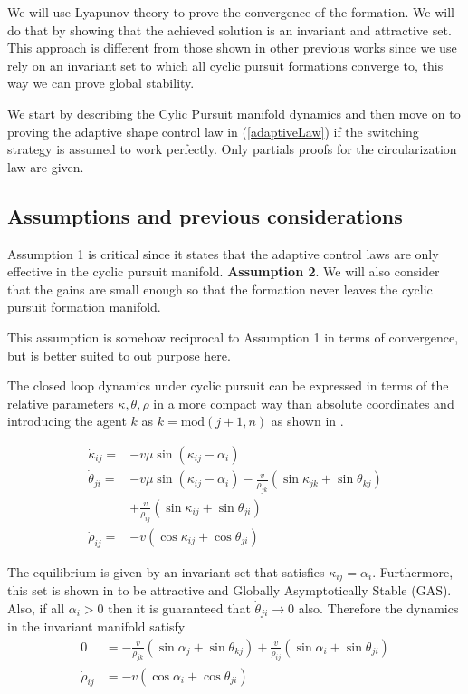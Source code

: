 We will use Lyapunov theory to prove the convergence of the formation. We will do that by showing that the achieved solution is an invariant and attractive set. This approach is different from those shown in other previous works since we use rely on an invariant set to which all cyclic pursuit formations converge to, this way we can prove global stability.

We start by describing the Cylic Pursuit manifold dynamics and then move on to proving the adaptive shape control law in (\ref{adaptiveLaw}) if the switching strategy is assumed to work perfectly. Only partials proofs for the circularization law are given.

\subsection{Assumptions and previous considerations}
Assumption 1 is critical since it states that the adaptive control laws are only effective in the cyclic pursuit manifold. 
\textbf{Assumption 2}. We will also consider that the gains are small enough so that the formation never leaves the cyclic pursuit formation manifold.

This assumption is somehow reciprocal to Assumption 1 in terms of convergence, but is better suited to out purpose here.

The closed loop dynamics under cyclic pursuit can be expressed in terms of the relative parameters $\kappa, \theta, \rho$ in a more compact way than absolute coordinates and introducing the agent $k$ as $k=\textrm{mod}(j+1,n)$ as shown in \cite{galloway2013symmetry}. 

\begin{align*}
  \dot{\kappa}_{ij} =& -v \mu \sin (\kappa_{ij} - \alpha_i) \\
  \dot{\theta}_{ji} =& -v \mu  \sin (\kappa_{ij} - \alpha_i)
  - \frac{v}{\rho_{jk}} (\sin \kappa_{jk} + \sin \theta_{kj}) \\
  &+ \frac{v}{\rho_{ij}} (\sin \kappa_{ij} + \sin \theta_{ji}) \\
  \dot{\rho}_{ij} =& -v (\cos \kappa_{ij} + \cos \theta_{ji})
\end{align*}

The equilibrium is given by an invariant set that satisfies $\kappa_{ij} = \alpha_i$. Furthermore, this set is shown  in \cite{galloway2013symmetry} to be attractive and Globally Asymptotically Stable (GAS). Also, if all $\alpha_i>0$ then it is guaranteed that $\dot{\theta}_{ji} \to 0$ also. Therefore the dynamics in the invariant manifold satisfy
\begin{align*}
  0 &= - \frac{v}{\rho_{jk}} (\sin \alpha_j + \sin \theta_{kj})
  + \frac{v}{\rho_{ij}} (\sin \alpha_i + \sin \theta_{ji}) \\
  \dot{\rho}_{ij} &= -v (\cos \alpha_i + \cos \theta_{ji})
\end{align*}

